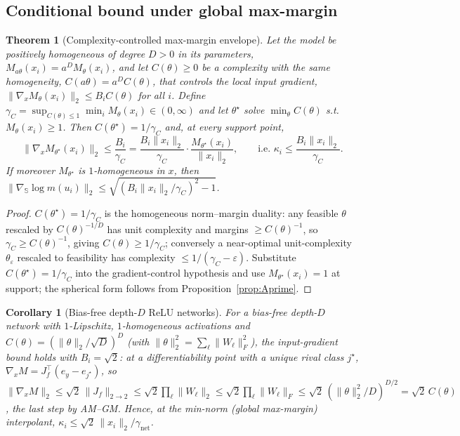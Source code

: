 \documentclass[11pt]{article}
\newtheorem{theorem}{Theorem}
\newtheorem{corollary}{Corollary}
\theoremstyle{definition}
\newcommand{\Sph}{\mathbb{S}}
\newcommand{\grad}{\nabla}
\begin{document}
\subsection{Conditional bound under global max-margin}\label{sec:Thm1}
\begin{theorem}[Complexity-controlled max-margin envelope]\label{thm:complexity}
Let the model be positively homogeneous of degree $D>0$ in its parameters,
$M_{a\theta}(x_i)=a^DM_\theta(x_i)$, and let $C(\theta)\ge0$ be a complexity with the
same homogeneity, $C(a\theta)=a^DC(\theta)$, that controls the local input gradient,
$\|\grad_x M_\theta(x_i)\|_2\le B_iC(\theta)$ for all $i$. Define
$\gamma_C=\sup_{C(\theta)\le1}\min_i M_\theta(x_i)\in(0,\infty)$ and let $\theta^\star$
solve $\min_\theta C(\theta)$ s.t.\ $M_\theta(x_i)\ge1$. Then $C(\theta^\star)=1/\gamma_C$
and, at every support point,
\[
  \|\grad_x M_{\theta^\star}(x_i)\|_2\le\frac{B_i}{\gamma_C}
  =\frac{B_i\|x_i\|_2}{\gamma_C}\cdot\frac{M_{\theta^\star}(x_i)}{\|x_i\|_2},
  \qquad\text{i.e. } \kappa_i\le\frac{B_i\|x_i\|_2}{\gamma_C}.
\]
If moreover $M_{\theta^\star}$ is $1$-homogeneous in $x$, then
$\|\grad_{\Sph}\log m(u_i)\|_2\le\sqrt{(B_i\|x_i\|_2/\gamma_C)^2-1}$.
\end{theorem}
\begin{proof}
$C(\theta^\star)=1/\gamma_C$ is the homogeneous norm--margin duality: any feasible
$\theta$ rescaled by $C(\theta)^{-1/D}$ has unit complexity and margins
$\ge C(\theta)^{-1}$, so $\gamma_C\ge C(\theta)^{-1}$, giving $C(\theta)\ge1/\gamma_C$;
conversely a near-optimal unit-complexity $\theta_\varepsilon$ rescaled to feasibility
has complexity $\le1/(\gamma_C-\varepsilon)$. Substitute $C(\theta^\star)=1/\gamma_C$
into the gradient-control hypothesis and use $M_{\theta^\star}(x_i)=1$ at support;
the spherical form follows from Proposition~\ref{prop:Aprime}.
\end{proof}

\begin{corollary}[Bias-free depth-$D$ ReLU networks]\label{cor:relu}
For a bias-free depth-$D$ network with $1$-Lipschitz, $1$-homogeneous activations and
$C(\theta)=(\|\theta\|_2/\sqrt D)^D$ (with $\|\theta\|_2^2=\sum_\ell\|W_\ell\|_F^2$),
the input-gradient bound holds with $B_i=\sqrt2$: at a differentiability point with a
unique rival class $j^\star$, $\grad_xM=J_f^\top(e_y-e_{j^\star})$, so
$\|\grad_xM\|_2\le\sqrt2\,\|J_f\|_{2\to2}\le\sqrt2\prod_\ell\|W_\ell\|_2
\le\sqrt2\prod_\ell\|W_\ell\|_F\le\sqrt2\,(\|\theta\|_2^2/D)^{D/2}=\sqrt2\,C(\theta)$,
the last step by AM--GM. Hence, at the min-norm (global max-margin) interpolant,
$\kappa_i\le\sqrt2\,\|x_i\|_2/\gamma_{\mathrm{net}}$.
\end{corollary}
\end{document}
